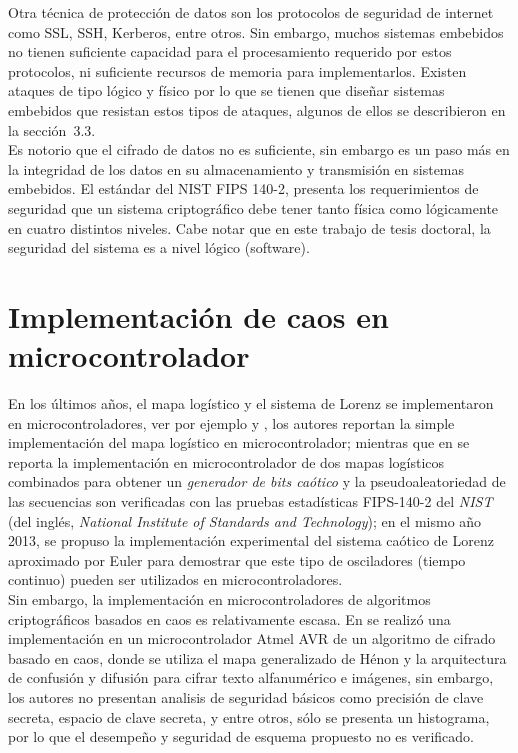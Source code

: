 Otra técnica de protección de datos son los protocolos de seguridad de internet como SSL, SSH, Kerberos, entre otros. Sin embargo, muchos sistemas embebidos no tienen suficiente capacidad para el procesamiento requerido por estos protocolos, ni suficiente recursos de memoria para implementarlos. Existen ataques de tipo lógico y físico por lo que se tienen que diseñar sistemas embebidos que resistan estos tipos de ataques, algunos de ellos se describieron en la sección~3.3. \\

Es notorio que el cifrado de datos no es suficiente, sin embargo es un paso más en la integridad de los datos en su almacenamiento y transmisión en sistemas embebidos. El estándar del NIST FIPS 140-2, presenta los requerimientos de seguridad que un sistema criptográfico debe tener tanto física como lógicamente en cuatro distintos niveles. Cabe notar que en este trabajo de tesis doctoral, la seguridad del sistema es a nivel lógico (software).  

\section{Implementación de caos en microcontrolador}
En los últimos años, el mapa logístico y el sistema de Lorenz se implementaron en microcontroladores, ver por ejemplo \cite{A-SEtAl_2011} y \cite{SyJ_2011}, los autores reportan la simple implementación del mapa logístico en microcontrolador; mientras que en \cite{V_2013} se reporta la implementación en microcontrolador de dos mapas logísticos combinados para obtener un \textit{generador de bits caótico} y la pseudoaleatoriedad de las secuencias son verificadas con las pruebas estadísticas FIPS-140-2 del \textit{NIST} (del inglés, \textit{National Institute of Standards and Technology}); en el mismo año 2013, \cite{CEtAl_2013} se propuso la implementación experimental del sistema caótico de Lorenz aproximado por Euler para demostrar que este tipo de osciladores (tiempo continuo) pueden ser utilizados en microcontroladores. \\    

Sin embargo, la implementación en microcontroladores de algoritmos criptográficos basados en caos es relativamente escasa. En \cite{SyD_2012} se realizó una implementación en un microcontrolador Atmel AVR de un algoritmo de cifrado basado en caos, donde se utiliza el mapa generalizado de Hénon y la arquitectura de confusión y difusión para cifrar texto alfanumérico e imágenes, sin embargo, los autores no presentan analisis de seguridad básicos como precisión de clave secreta, espacio de clave secreta, y entre otros, sólo se presenta un histograma, por lo que el desempeño y seguridad de esquema propuesto no es verificado. \\

